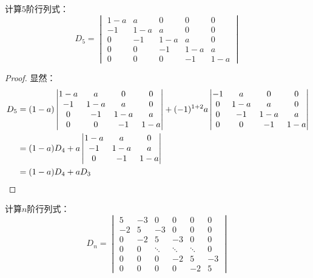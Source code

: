 \begin{theorem}
	计算$5$阶行列式：
	\begin{equation*}
		D_{5}=
		\begin{vmatrix}
			1-a & a & 0 & 0 & 0 \\
			-1 & 1-a & a & 0 & 0 \\
			0 & -1 & 1-a & a & 0 \\
			0 & 0 & -1 & 1-a & a \\
			0 & 0 & 0 & -1 & 1-a
		\end{vmatrix}
	\end{equation*}
\end{theorem}
\begin{proof}
	显然：
	\begin{align*}
		D_5&=(1-a)
		\begin{vmatrix}
			1-a & a & 0 & 0 \\
			-1 & 1-a & a & 0 \\
			0 & -1 & 1-a & a \\
			0 & 0 & -1 & 1-a
		\end{vmatrix}
		+(-1)^{1+2}a
		\begin{vmatrix}
			-1 & a & 0 & 0 \\
			0 & 1-a & a & 0 \\
			0 & -1 & 1-a & a \\
			0 & 0 & -1 & 1-a
		\end{vmatrix} \\
		&=(1-a)D_4+a
		\begin{vmatrix}
			1-a & a & 0 \\
			-1 & 1-a & a \\
			0 & -1 & 1-a
		\end{vmatrix} \\
		&=(1-a)D_4+aD_3\qedhere
	\end{align*}
\end{proof}
\begin{theorem}
	计算$n$阶行列式：
	\begin{equation*}
		D_n=
		\begin{vmatrix}
			5 & -3 & 0 & 0 & 0 & 0 \\
			-2 & 5 & -3 & 0 & 0 & 0 \\
			0 & -2 & 5 & -3 & 0 & 0 \\
			0 & 0 & \ddots & \ddots & \ddots & 0 \\
			0 & 0 & 0 & -2 & 5 & -3 \\
			0 & 0 & 0 & 0 & -2 & 5
		\end{vmatrix}
	\end{equation*}
\end{theorem}
